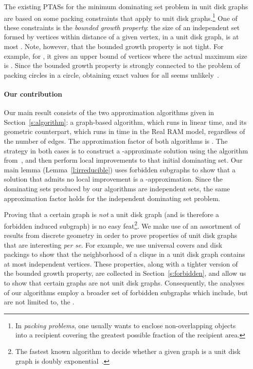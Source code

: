 \documentclass[preprint,12pt]{elsarticle}
\begin{document}
The existing PTASs for the minimum dominating set problem in unit disk graphs are based on some packing constraints
that apply to unit disk graphs.\footnote{In \emph{packing problems}, one usually wants to enclose non-{over\-lapping} objects into a recipient  
covering the greatest possible fraction of the recipient area.} 
One of these constraints is the \emph{bounded growth property}: the size of an independent set formed by vertices within distance  of a given vertex, in a unit disk graph, is at most . Note, however, that the bounded growth property is not tight. For example, for , it gives an upper bound of  vertices where the actual maximum size is . Since the bounded growth property is strongly connected to the problem of packing circles in a circle, obtaining exact values for all  seems unlikely~\cite{Fodor}.


\paragraph*{Our contribution}
Our main result consists of the two approximation algorithms given in Section~\ref{s:algorithm}: a graph-based algorithm, which runs in linear  time, and its geometric counterpart, which runs in  time in the Real RAM model, regardless of the number of edges.
The approximation factor of both algorithms is . The strategy in both cases is to construct a -approximate solution using the algorithm from~\cite{heuristics}, and then perform local improvements to that initial dominating set. Our main lemma (Lemma~\ref{l:irreducible}) uses forbidden subgraphs to show that a solution that admits no local improvement is a -approximation. Since the dominating sets produced by our algorithms are independent sets, the same approximation factor holds for the independent dominating set problem.

Proving that a certain graph is \emph{not} a unit disk graph (and is therefore a forbidden induced subgraph) is no easy feat\footnote{The fastest known algorithm to decide whether a given graph is a unit disk graph is doubly exponential~\cite{spinrad}.}. We make use of an assortment of results from discrete geometry in order to prove properties of unit disk graphs that are interesting \textit{per se}.
For example, we use universal covers and disk packings to show that the neighborhood of a clique in a unit disk graph contains at most  independent vertices.
These properties, along with a tighter version of the bounded growth property, are collected in Section~\ref{s:forbidden}, and
allow us to show that certain graphs are not unit disk graphs. Consequently, the analyses of our algorithms employ a broader set of forbidden subgraphs which include, but are not limited to, the .
\end{document}

